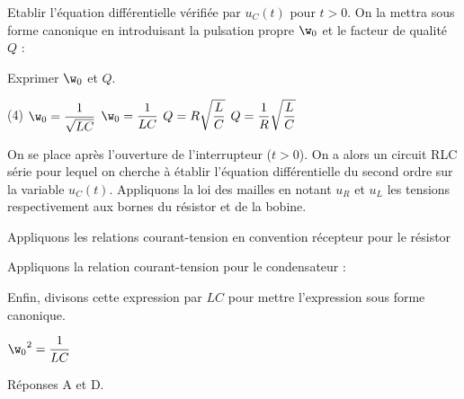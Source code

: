 \documentclass[a4paper, 12pt, final, garamond]{book}
\begin{document}
\QR
{Etablir l’équation différentielle vérifiée par $u_C(t)$ pour $t>0$.
	On la mettra sous forme canonique en introduisant la pulsation propre $\w_0$ et le facteur de qualité $Q$ :



	\noindent
	Exprimer $\w_0$ et $Q$.
	\begin{tasks}[label=\protect\fbox{\Alph*}, label-width=4ex](4)
		\task $\w_0=\f{1}{\sqrt{LC}}$
		\task $\w_0=\f{1}{LC}$
		\task $Q=R\sqrt{\f{L}{C}}$
		\task $Q=\f{1}{R}\sqrt{\f{L}{C}}$
	\end{tasks}
}
{
	On se place après l’ouverture de l’interrupteur ($t>0$).
	On a alors un circuit RLC série pour lequel on cherche à établir l’équation différentielle du second ordre sur la variable $u_C\left(t\right)$. Appliquons la loi des mailles en notant $u_R$ et $u_L$ les tensions respectivement aux bornes du résistor et de la bobine.



	\noindent
	Appliquons les relations courant-tension en convention récepteur pour le résistor




	Appliquons la relation courant-tension pour le condensateur :



	Enfin, divisons cette expression par $LC$ pour mettre l’expression sous forme canonique.


	 {${\w_0}^2=\f{1}{LC}$}



	\medskip

	\noindent
	Réponses A et D.
}
\end{document}
